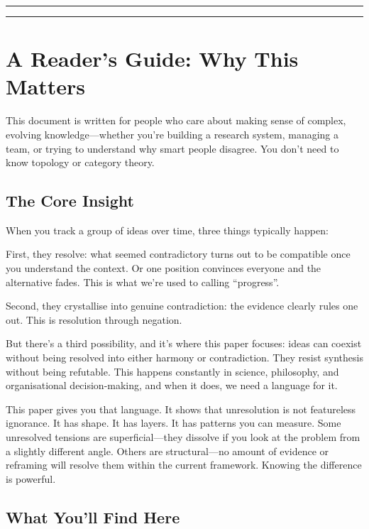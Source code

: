 \documentclass[11pt,letterpaper]{article}
\theoremstyle{definition}
\theoremstyle{remark}
\begin{document}
\vspace{0.4cm}
\hrule
\vspace{0.4cm}
\tableofcontents
\vspace{0.4cm}
\hrule

\newpage

\section{A Reader's Guide: Why This Matters}

This document is written for people who care about making sense of complex, evolving knowledge---whether you're building a research system, managing a team, or trying to understand why smart people disagree. You don't need to know topology or category theory.

\subsection*{The Core Insight}

When you track a group of ideas over time, three things typically happen:

First, they resolve: what seemed contradictory turns out to be compatible once you understand the context. Or one position convinces everyone and the alternative fades. This is what we're used to calling ``progress''.

Second, they crystallise into genuine contradiction: the evidence clearly rules one out. This is resolution through negation.

But there's a third possibility, and it's where this paper focuses: ideas can coexist without being resolved into either harmony or contradiction. They resist synthesis without being refutable. This happens constantly in science, philosophy, and organisational decision-making, and when it does, we need a language for it.

This paper gives you that language. It shows that unresolution is not featureless ignorance. It has shape. It has layers. It has patterns you can measure. Some unresolved tensions are superficial---they dissolve if you look at the problem from a slightly different angle. Others are structural---no amount of evidence or reframing will resolve them within the current framework. Knowing the difference is powerful.

\subsection*{What You'll Find Here}
\end{document}
